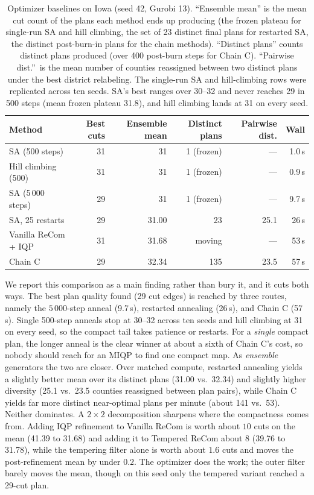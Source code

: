 \documentclass[11pt]{article}
\begin{document}
\begin{table}[H]
\centering
\small
\begin{tabular}{lrrrrr}
\toprule
Method & Best cuts & Ensemble mean & Distinct plans & Pairwise dist. & Wall \\
\midrule
SA (500 steps)           & 31 & 31    & 1 (frozen)  & ---  & 1.0\,s \\
Hill climbing (500)      & 31 & 31    & 1 (frozen)  & ---  & 0.9\,s \\
SA (5\,000 steps)        & 29 & 31    & 1 (frozen)  & ---  & 9.7\,s \\
SA, 25 restarts          & 29 & 31.00 & 23          & 25.1 & 26\,s \\
Vanilla ReCom + IQP      & 31 & 31.68 & moving      & ---  & 53\,s \\
Chain C                  & 29 & 32.34 & 135         & 23.5 & 57\,s \\
\bottomrule
\end{tabular}
\caption{Optimizer baselines on Iowa (seed 42,
  Gurobi 13). ``Ensemble mean'' is the mean cut count of the plans
  each method ends up producing (the frozen plateau for single-run
  SA and hill climbing, the set of 23 distinct final plans for
  restarted SA, the distinct post-burn-in plans for the chain
  methods). ``Distinct plans'' counts distinct plans produced (over
  400 post-burn steps for Chain C). ``Pairwise dist.''\ is the mean
  number of counties reassigned between two distinct plans under the
  best district relabeling. The single-run SA and hill-climbing rows
  were replicated across ten seeds. SA's best ranges over 30--32 and
  never reaches 29 in 500 steps (mean frozen plateau 31.8), and hill
  climbing lands at 31 on every
  seed.}\label{tab:optimizer-baselines}
\end{table}

We report this comparison as a main finding rather than bury it, and
it cuts both ways. The best plan quality found (29 cut edges) is
reached by three routes, namely the $5\,000$-step anneal (9.7\,s),
restarted annealing (26\,s), and Chain C (57\,s). Single 500-step
anneals stop at 30--32 across ten seeds and hill climbing at 31 on
every seed, so the compact tail takes patience or restarts. For a
\emph{single} compact plan, the longer anneal is the clear winner at
about a sixth of Chain C's cost, so nobody should reach for an MIQP
to find one compact map. As \emph{ensemble} generators the two are
closer. Over matched compute, restarted annealing yields a
slightly better mean over its distinct plans (31.00 vs.\ 32.34) and
slightly higher diversity (25.1 vs.\ 23.5 counties reassigned between
plan pairs), while Chain C yields far more distinct near-optimal
plans per minute (about 141 vs.\ 53). Neither dominates. A
$2 \times 2$
decomposition sharpens where the compactness comes from. Adding IQP
refinement to Vanilla ReCom is worth about $10$ cuts on the mean
(41.39 to 31.68) and adding it to Tempered ReCom about $8$ (39.76 to
31.78), while the tempering filter alone is worth about $1.6$ cuts
and moves the post-refinement mean by under $0.2$. The optimizer does
the work; the outer filter barely moves the mean, though on this seed
only the tempered variant reached a 29-cut plan.
\end{document}

